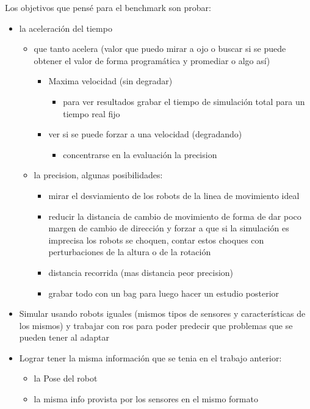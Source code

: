 Los objetivos que pensé para el benchmark son probar:
\begin{itemize}
  \item la aceleración del tiempo 
  \begin{itemize}
    \item que tanto acelera (valor que puedo mirar a ojo o buscar si se puede obtener el valor de forma programática y promediar o algo así)
    \begin{itemize}
      \item Maxima velocidad (sin degradar)
      \begin{itemize}
        \item para ver resultados grabar el tiempo de simulación total para un tiempo real fijo
      \end{itemize}
      \item ver si se puede forzar a una velocidad (degradando)
      \begin{itemize}
        \item concentrarse en la evaluación la precision
      \end{itemize}
    \end{itemize}
    \item la precision, algunas posibilidades:
    \begin{itemize}
      \item mirar el desviamiento de los robots de la linea de movimiento ideal
      \item reducir la distancia de cambio de movimiento de forma de dar poco margen de cambio de dirección y forzar a que si la simulación 
           es imprecisa los robots se choquen, contar estos choques con perturbaciones de la altura o de la rotación
      \item distancia recorrida (mas distancia peor precision)
      \item grabar todo con un bag para luego hacer un estudio posterior
    \end{itemize}
  \end{itemize}

  \item Simular usando robots iguales (mismos tipos de sensores y características de los mismos) y trabajar con ros para poder predecir que problemas que se pueden tener al adaptar
    
  \item Lograr tener la misma información que se tenia en el trabajo anterior:
  \begin{itemize}
    \item la Pose del robot
    \item la misma info provista por los sensores en el mismo formato
  \end{itemize}


\end{itemize}
